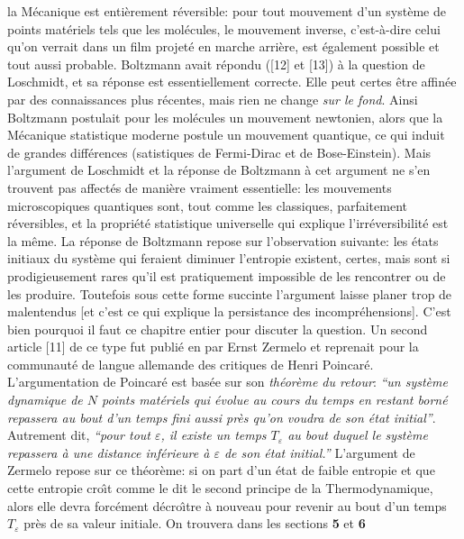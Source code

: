 la M\'ecanique est enti\`erement r\'eversible: pour tout mouvement d'un
syst\`eme de points mat\'eriels tels que les mol\'ecules,
le mouvement inverse, c'est-\`a-dire celui qu'on verrait dans un film 
projet\'e en marche arri\`ere, est \'egalement possible et tout aussi 
pro\-bable. Boltzmann avait r\'epondu ([12] et [13]) \`a la question de
Loschmidt, et sa r\'eponse est essentiellement 
correcte. Elle peut certes \^etre affin\'ee par des connaissances plus 
r\'ecentes, mais rien ne change {\it sur le fond}. Ainsi Boltzmann 
postulait pour les mol\'ecules un mouvement newtonien, alors que la 
M\'ecanique statistique moderne postule un mouvement quantique, ce qui 
induit de grandes diff\'erences (satistiques de Fermi-Dirac et de 
Bose-Einstein). Mais l'argument de Loschmidt et la r\'eponse de Boltzmann 
\`a cet argument ne s'en trouvent pas affect\'es de mani\`ere vraiment
essentielle: les mouvements microscopiques quantiques sont, tout comme 
les classiques, parfaitement r\'eversibles, et la propri\'et\'e statistique
universelle qui explique l'irr\'eversibilit\'e est la m\^eme. La 
r\'eponse de Boltzmann repose sur l'observation suivante: les \'etats 
initiaux du syst\`eme qui feraient diminuer l'entropie existent, certes, 
mais sont si prodigieusement rares qu'il est pratiquement impossible de 
les rencontrer ou de les produire. Toutefois sous cette forme succinte 
l'argument laisse planer trop de malentendus [et c'est ce qui explique 
la persistance des incompr\'ehensions]. C'est bien pourquoi il faut ce 
chapitre entier pour discuter la question. 
\medskip
Un second article [11]
de ce type fut publi\'e en {} par Ernst Zermelo et reprenait 
pour la communaut\'e de langue allemande des critiques de Henri Poincar\'e.
L'argumentation de Poincar\'e est bas\'ee sur son {\it th\'eor\`eme du
retour}: {\sl ``un syst\`eme dynamique de $N$ points mat\'eriels qui 
\'evolue au cours du temps en restant born\'e repassera au bout d'un 
temps fini aussi pr\`es qu'on voudra de son \'etat initial''}.
Autrement dit, {\sl  ``pour tout $\varepsilon$, il existe un temps
$T_{\varepsilon}$ au bout duquel le syst\`eme repassera \`a une distance
inf\'erieure \`a $\varepsilon$ de son \'etat initial.'' }
\medskip
L'argument de Zermelo repose sur ce th\'eor\`eme: si on part d'un \'etat de 
faible entropie et que cette entropie cro{\^\i}t comme le dit le second
principe de la Thermodynamique, alors elle devra forc\'ement d\'ecro{\^\i}tre 
\`a nouveau pour revenir au bout d'un temps $T_\varepsilon$ pr\`es de 
sa valeur initiale. On trouvera dans les sections {\bf 5} et {\bf 6} 
